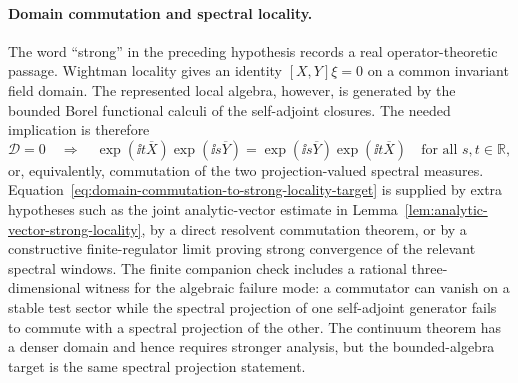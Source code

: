 \paragraph{Domain commutation and spectral locality.}
The word ``strong'' in the preceding hypothesis records a real
operator-theoretic passage.  Wightman locality gives an identity
\([X,Y]\xi=0\) on a common invariant field domain.  The represented local
algebra, however, is generated by the bounded Borel functional calculi of the
self-adjoint closures.  The needed implication is therefore
\begin{equation}
  [X,Y]\mathcal D=0
  \quad\Longrightarrow\quad
  \exp(\ii t\overline X)\exp(\ii s\overline Y)
  =
  \exp(\ii s\overline Y)\exp(\ii t\overline X)
  \quad\text{for all }s,t\in\mathbb R ,
  \label{eq:domain-commutation-to-strong-locality-target}
\end{equation}
or, equivalently, commutation of the two projection-valued spectral measures.
Equation~\eqref{eq:domain-commutation-to-strong-locality-target} is supplied
by extra hypotheses such as the joint analytic-vector estimate in
Lemma~\ref{lem:analytic-vector-strong-locality}, by a direct resolvent
commutation theorem, or by a constructive finite-regulator limit proving
strong convergence of the relevant spectral windows.  The finite companion
check  includes a
rational three-dimensional witness for the algebraic failure mode: a
commutator can vanish on a stable test sector while the spectral projection
of one self-adjoint generator fails to commute with a spectral projection of
the other.  The continuum theorem has a denser domain and hence requires
stronger analysis, but the bounded-algebra target is the same spectral
projection statement.

